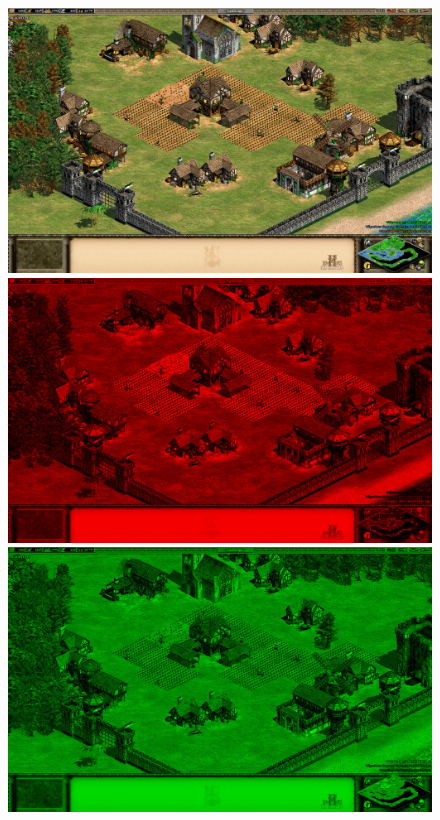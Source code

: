 \begin{figure}[H]
\begin{center}
\includegraphics[scale=0.2]{imgs/rgb_all.jpg}
\includegraphics[scale=0.2]{imgs/red.jpg}
\includegraphics[scale=0.2]{imgs/green.jpg}

\end{center}
\end{figure}
